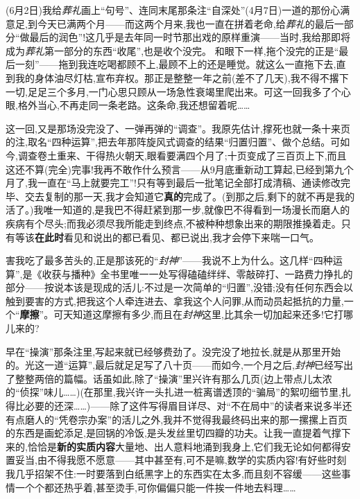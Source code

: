 \dmark{}(6月2日)我给\emph{葬礼}画上“句号”、连同末尾那条注“自深处”(4月7日)一道的那份心满意足,到今天已满两个月——而这两个月来,我也一直在拼着老命,给\emph{葬礼}的最后一部分“做最后的润色”!这几乎是去年同一时节那出戏的原样重演——当时,我给那即将成为\emph{葬礼}第一部分的东西“收尾”,也是收个没完。
和眼下一样,拖个没完的正是“最后一刻”——拖到我连吃喝都顾不上,最顾不上的还是睡觉。就这么一直拖下去,直到我的身体油尽灯枯,宣布弃权。那正是整整一年之前(差不了几天),我不得不撂下一切,足足三个多月,一门心思只顾从一场急性衰竭里爬出来。可这一回我多了个心眼,格外当心,不再走同一条老路。这条命,我还想留着呢……

这一回,又是那场没完没了、一弹再弹的“调查”。我原先估计,撑死也就一条十来页的注,取名“四种运算”,把去年那阵旋风式调查的结果“归置归置”、做个总结。可如今,调查卷土重来、干得热火朝天,眼看要满四个月了;十页变成了三百页上下,而且这还不算(完全)完事!我再不敢作什么预言——从9月底重新动工算起,已经到第九个月了,我一直在“马上就要完工”!只有等到最后一批笔记全部打成清稿、通读修改完毕、交去复制的那一天,我才会知道它\textbf{真的}完成了。(到那之后,剩下的就不再是我的活了。)我唯一知道的,是我巴不得赶紧到那一步,就像巴不得看到一场漫长而磨人的疾病有个尽头;而我必须尽我所能走到终点,不被种种想象出来的期限推搡着走。只有等该\textbf{在此时}看见和说出的都已看见、都已说出,我才会停下来喘一口气。

害我吃了最多苦头的,正是那该死的“\emph{封神}”——我说不上为什么。这几样“四种运算”,是《收获与播种》全书里唯一一处写得磕磕绊绊、零敲碎打、一路费力挣扎的部分——按说本该是现成的活儿:不过是一次简单的“归置”,没错;没有任何东西会以触到\dmark{}要害的方式,把我这个人牵连进去、拿我这个人问罪,从而动员起抵抗的力量,一个“\textbf{摩擦}”。可天知道这摩擦有多少,而且在\emph{封神}这里,比其余一切加起来还多!它打哪儿来的?

早在“操演”那条注里,写起来就已经够费劲了。没完没了地拉长,就是从那里开始的。光这一道“运算”,最后就足足写了八十页——而如今,一个月之后,\emph{封神}已经写出了整整两倍的篇幅。话虽如此,除了“操演”里兴许有那么几页(边上带点儿太浓的“侦探”味儿……)(在那里,我兴许一头扎进一桩离谱透顶的“骗局”的絮叨细节里,扎得比必要的还深……)——除了这件写得眉目详尽、对“不在局中”的读者来说多半还有点磨人的“凭卷宗办案”的活儿之外,我并不觉得我最终码出来的那一摞摞上百页的东西是画蛇添足,是回锅的冷饭,是头发丝里切四瓣的功夫。让我一直提着气撑下来的,恰恰是\textbf{新的实质内容}大量地、出人意料地涌到我身上,它们我无论如何都得安置妥当,由不得我愿不愿意——其中甚至有,可不是嘛,数学的实质内容!有好些时刻我几乎招架不住:一时要落到白纸黑字上的东西实在太多,而且刻不容缓——这些事情一个个都还热乎着,甚至烫手,可你偏偏只能一件挨一件地去料理……

